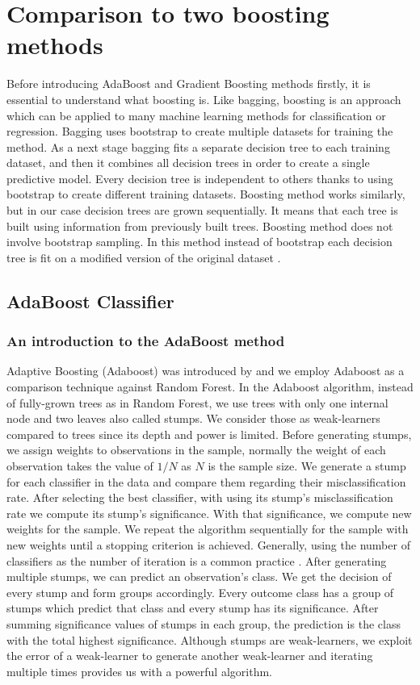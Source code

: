 \section{Comparison to two boosting methods}
Before introducing AdaBoost and Gradient Boosting methods firstly, 
it is essential to understand what boosting is. 
Like bagging, boosting is an approach which can be applied to many machine learning methods for 
classification or regression. Bagging uses bootstrap to create multiple datasets for training the method. 
As a next stage bagging fits a separate decision tree to each training dataset, 
and then it combines all decision trees in order to create a single predictive model. 
Every decision tree is independent to others thanks to using bootstrap to create different training datasets. 
Boosting method works similarly, but in our case decision trees are grown sequentially. 
It means that each tree is built using information from previously built trees. 
Boosting method does not involve bootstrap sampling. 
In this method instead of bootstrap each decision tree is fit on a modified version of 
the original dataset \cite{James2013}.

\subsection{AdaBoost Classifier}
\label{sec:adaboost}

\subsubsection{An introduction to the AdaBoost method}
Adaptive Boosting (Adaboost) was introduced by \cite{freund1997boosting} and we employ Adaboost as a comparison 
technique against Random Forest. In the Adaboost algorithm, instead of fully-grown trees as in Random Forest, 
we use trees with only one internal node and two leaves also called stumps. We consider those as weak-learners 
compared to trees since its depth and power is limited. Before generating stumps, 
we assign weights to observations in the sample, normally the weight of each observation takes the value 
of $1/N$ as $N$ is the sample size. We generate a stump for each classifier in the data and compare them regarding 
their misclassification rate. After selecting the best classifier, with using its stump's misclassification rate 
we compute its stump's significance. With that significance, we compute new weights for the sample. 
We repeat the algorithm sequentially for the sample with new weights until a stopping criterion is achieved. 
Generally, using the number of classifiers as the number of iteration is a common practice \cite{friedman2001elements}. 
After generating multiple stumps, we can predict an observation's class. 
We get the decision of every stump and form groups accordingly. 
Every outcome class has a group of stumps which predict that class and every stump has its significance. 
After summing significance values of stumps in each group, the prediction is the class with the total highest significance. 
Although stumps are weak-learners, we exploit the error of a weak-learner to generate another weak-learner 
and iterating multiple times provides us with a powerful algorithm.

